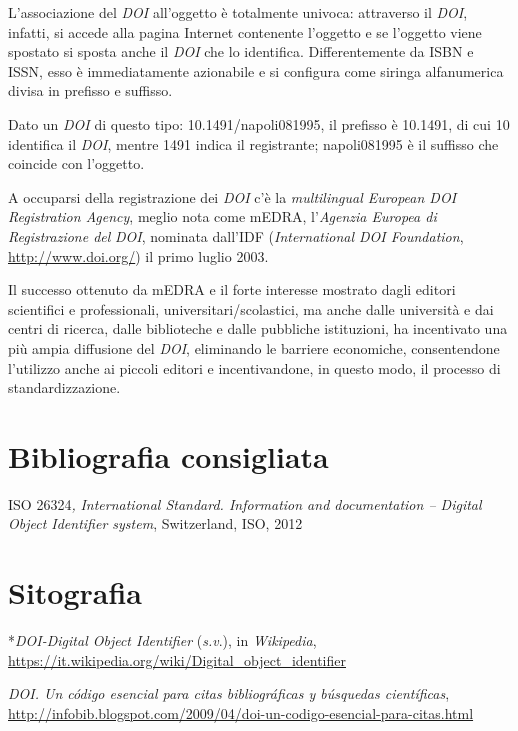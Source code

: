 \documentclass[
  b5paper,
  twoside,
  12pt,
  chapterprefix=false,
  bibliography=totocnumbered,
  parskip=false]{scrbook}
\begin{document}
L'associazione del \emph{DOI} all'oggetto è totalmente univoca: attraverso il
\emph{DOI}, infatti, si accede alla pagina Internet contenente l'oggetto e se
l'oggetto viene spostato si sposta anche il \emph{DOI} che lo identifica.
Differentemente da ISBN e ISSN, esso è immediatamente azionabile e si
configura come siringa alfanumerica divisa in prefisso e suffisso.

Dato un \emph{DOI} di questo tipo: 10.1491/napoli081995, il prefisso è
10.1491, di cui 10 identifica il \emph{DOI}, mentre 1491 indica il
registrante; napoli081995 è il suffisso che coincide con l'oggetto.

A occuparsi della registrazione dei \emph{DOI} c'è la \emph{multilingual European
DOI Registration Agency}, meglio nota come mEDRA, l'\emph{Agenzia Europea di
Registrazione del} \emph{DOI}, nominata dall'IDF (\emph{International DOI
Foundation}, \url{http://www.doi.org/}) il primo
luglio 2003.

Il successo ottenuto da mEDRA e il forte interesse mostrato dagli
editori scientifici e professionali, universitari/scolastici, ma anche
dalle università e dai centri di ricerca, dalle biblioteche e dalle
pubbliche istituzioni, ha incentivato una più ampia diffusione del
\emph{DOI}, eliminando le barriere economiche, consentendone l'utilizzo anche
ai piccoli editori e incentivandone, in questo modo, il processo di
standardizzazione.

\hypertarget{bibliografia-consigliata-7}{%
\section*{Bibliografia consigliata}\label{bibliografia-consigliata-7}}

ISO 26324\emph{,} \emph{International Standard. Information and documentation --
Digital Object Identifier system}, Switzerland, ISO, 2012

\hypertarget{sitografia-9}{%
\section*{Sitografia}\label{sitografia-9}}

*\emph{DOI-Digital Object Identifier} (\emph{s.v}.), in \emph{Wikipedia},
\url{https://it.wikipedia.org/wiki/Digital_object_identifier}

\emph{DOI. Un código esencial para citas bibliográficas y búsquedas científicas},
\url{http://infobib.blogspot.com/2009/04/doi-un-codigo-esencial-para-citas.html}
\end{document}
